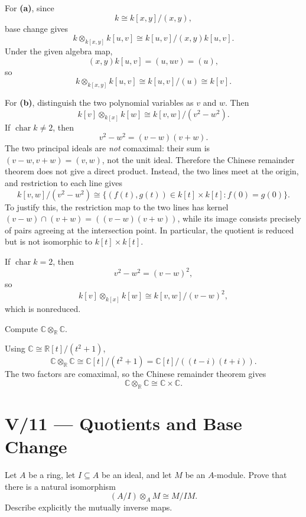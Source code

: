 \begin{solution}
For \textbf{(a)}, since
\[
k\cong k[x,y]/(x,y),
\]
base change gives
\[
k\otimes_{k[x,y]}k[u,v]
\cong
k[u,v]/(x,y)k[u,v].
\]
Under the given algebra map,
\[
(x,y)k[u,v]=(u,uv)=(u),
\]
so
\[
k\otimes_{k[x,y]}k[u,v]
\cong
k[u,v]/(u)
\cong
k[v].
\]

For \textbf{(b)}, distinguish the two polynomial variables as \(v\) and \(w\).
Then
\[
k[v]\otimes_{k[x]}k[w]
\cong
k[v,w]/(v^2-w^2).
\]
If \(\operatorname{char}k\ne2\), then
\[
v^2-w^2=(v-w)(v+w).
\]
The two principal ideals are \emph{not} comaximal: their sum is
\((v-w,v+w)=(v,w)\), not the unit ideal. Therefore the Chinese
remainder theorem does not give a direct product. Instead, the two
lines meet at the origin, and restriction to each line gives
\[
k[v,w]/(v^2-w^2)
\cong
\{(f(t),g(t))\in k[t]\times k[t]:f(0)=g(0)\}.
\]
To justify this, the restriction map to the two lines has kernel
\((v-w)\cap(v+w)=((v-w)(v+w))\), while its image consists
precisely of pairs agreeing at the intersection point. In
particular, the quotient is reduced but is not isomorphic to
\(k[t]\times k[t]\).

If \(\operatorname{char}k=2\), then
\[
v^2-w^2=(v-w)^2,
\]
so
\[
k[v]\otimes_{k[x]}k[w]
\cong
k[v,w]/(v-w)^2,
\]
which is nonreduced.
\end{solution}


\begin{problem}[CP-V-0095]
\label{prob:cp-v-0095}
Compute \(\mathbb C\otimes_{\mathbb R}\mathbb C\).
\end{problem}

\begin{solution}
Using \(\mathbb C\cong\mathbb R[t]/(t^2+1)\),
\[
\mathbb C\otimes_{\mathbb R}\mathbb C
\cong
\mathbb C[t]/(t^2+1)
=
\mathbb C[t]/((t-i)(t+i)).
\]
The two factors are comaximal, so the Chinese remainder theorem gives
\[
\mathbb C\otimes_{\mathbb R}\mathbb C\cong\mathbb C\times\mathbb C.
\]
\end{solution}



\section*{V/11 --- Quotients and Base Change}

\begin{problem}[CP-V-0022]
\label{prob:cp-v-0022}
Let \(A\) be a ring, let \(I\subseteq A\) be an ideal, and let \(M\) be an
\(A\)-module. Prove that there is a natural isomorphism
\[
(A/I)\otimes_A M \cong M/IM.
\]
Describe explicitly the mutually inverse maps.
\end{problem}

